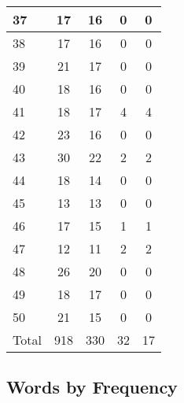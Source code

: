 \begin{center}
\begin{longtable}{l|c|c|c|c}
37 & 17 & 16 & 0 & 0\\ \hline
38 & 17 & 16 & 0 & 0\\ \hline
39 & 21 & 17 & 0 & 0\\ \hline
40 & 18 & 16 & 0 & 0\\ \hline
41 & 18 & 17 & 4 & 4\\ \hline
42 & 23 & 16 & 0 & 0\\ \hline
43 & 30 & 22 & 2 & 2\\ \hline
44 & 18 & 14 & 0 & 0\\ \hline
45 & 13 & 13 & 0 & 0\\ \hline
46 & 17 & 15 & 1 & 1\\ \hline
47 & 12 & 11 & 2 & 2\\ \hline
48 & 26 & 20 & 0 & 0\\ \hline
49 & 18 & 17 & 0 & 0\\ \hline
50 & 21 & 15 & 0 & 0\\ \hline
\hline \hline
Total & 918 & 330 & 32 & 17



\end{longtable}
\end{center}

 
\subsection{Words by Frequency}

